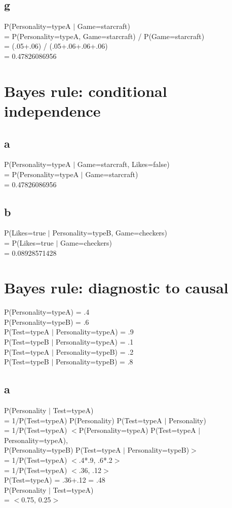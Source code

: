 \documentclass[12pt]{article}
\begin{document}
\subsection{g}
P(Personality=typeA $|$ Game=starcraft)\\
= P(Personality=typeA, Game=starcraft) / P(Game=starcraft)\\
= (.05+.06) / (.05+.06+.06+.06)\\
= 0.47826086956

\section{Bayes rule: conditional independence}
\subsection{a}
P(Personality=typeA $|$ Game=starcraft, Likes=false)\\
= P(Personality=typeA $|$ Game=starcraft)\\
= 0.47826086956
\subsection{b}
P(Likes=true $|$ Personality=typeB, Game=checkers)\\
= P(Likes=true $|$ Game=checkers)\\
= 0.08928571428

\section{Bayes rule: diagnostic to causal}
P(Personality=typeA) = .4\\
P(Personality=typeB) = .6\\
P(Test=typeA $|$ Personality=typeA) = .9\\
P(Test=typeB $|$ Personality=typeA) = .1\\
P(Test=typeA $|$ Personality=typeB) = .2\\
P(Test=typeB $|$ Personality=typeB) = .8
\subsection{a}
P(Personality $|$ Test=typeA)\\
= 1/P(Test=typeA) P(Personality) P(Test=typeA $|$ Personality)\\
= 1/P(Test=typeA) $<$P(Personality=typeA) P(Test=typeA $|$ Personality=typeA),\\
P(Personality=typeB) P(Test=typeA $|$ Personality=typeB)$>$\\
= 1/P(Test=typeA) $<$.4*.9, .6*.2$>$\\
= 1/P(Test=typeA) $<$.36, .12$>$\\
P(Test=typeA) = .36+.12 = .48\\
P(Personality $|$ Test=typeA)\\
= $<$0.75, 0.25$>$
\end{document}
